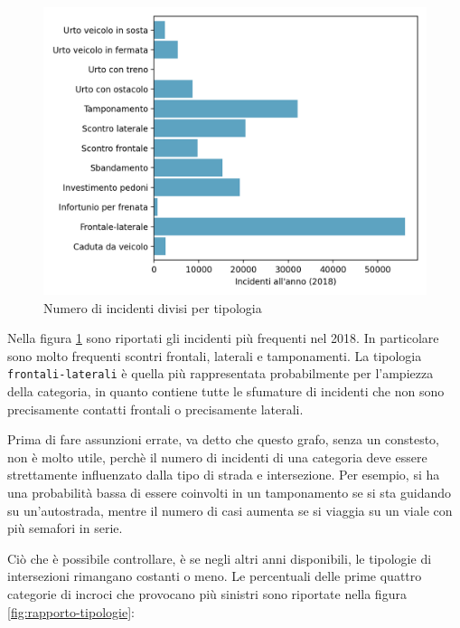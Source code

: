 \documentclass[a4paper,12pt]{report}
\newcommand{\columnstyle}[1]{\texttt{#1}}
\begin{document}
\begin{figure}
    \includegraphics[width=\linewidth]{../src/incidenti/incidenti_senza_coords/localizzazione_incidente/tipo_incidente.png}
    \caption{Numero di incidenti divisi per tipologia}
    \label{fig:tipo-incidente}
\end{figure}

Nella figura \ref{fig:tipo-incidente} sono riportati gli incidenti più frequenti nel 2018.
In particolare sono molto frequenti scontri frontali, laterali e tamponamenti. 
La tipologia \columnstyle{frontali-laterali} è quella più rappresentata probabilmente per 
l'ampiezza della categoria, in quanto contiene tutte le sfumature di incidenti che non sono 
precisamente contatti frontali o precisamente laterali.

Prima di fare assunzioni errate, va detto che questo grafo, senza un constesto, 
non è molto utile, perchè il numero di incidenti di una categoria deve 
essere strettamente influenzato dalla tipo di strada e intersezione. 
Per esempio, si ha una probabilità bassa di essere coinvolti in un tamponamento 
se si sta guidando su un'autostrada, mentre il numero di casi aumenta se si viaggia 
su un viale con più semafori in serie.

Ciò che è possibile controllare, è se negli altri anni disponibili, le 
tipologie di intersezioni rimangano costanti o meno.
Le percentuali delle prime quattro categorie di incroci che provocano più sinistri 
sono riportate nella figura \ref{fig:rapporto-tipologie}: 
\end{document}
